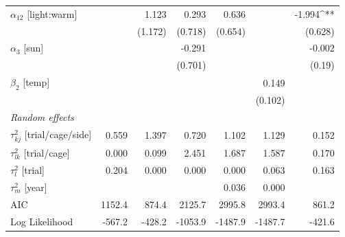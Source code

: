 \documentclass[11pt, oneside]{amsart}
\begin{document}
\begin{table}[!htp]
\begin{center}
\begin{small}
\begin{tabular}{l@{} D{.}{.}{4.6}@{} D{.}{.}{4.5}@{} D{.}{.}{5.6}@{} D{.}{.}{5.6}@{} D{.}{.}{5.4}@{} D{.}{.}{4.6}@{} }
$\alpha_{12}$ [light:warm]                     &              & 1.123       & 0.293       & 0.636       &           & -1.994^{**}  \\
                                               &              & (1.172)     & (0.718)     & (0.654)     &           & (0.628)      \\
$\alpha_{3}$ [sun]                             &              &             & -0.291      &             &           & -0.002       \\
                                               &              &             & (0.701)     &             &           & (0.19)       \\
$\beta_2$ [temp]                               &              &             &             &             & 0.149     &              \\
                                               &              &             &             &             & (0.102)  &              \\
\textit{Random effects} & & & & & & \\
$\tau^2_{kj}$ [trial/cage/side]              & 0.559        & 1.397       & 0.720       & 1.102       & 1.129     & 0.152        \\
$\tau^2_{lk}$ [trial/cage]                   & 0.000        & 0.099       & 2.451       & 1.687       & 1.587     & 0.170        \\
$\tau^2_{l}$ [trial]                         & 0.204        & 0.000       & 0.000       & 0.000       & 0.063     & 0.163        \\
$\tau^2_{m}$ [year]                          &              &             &             & 0.036       & 0.000     &              \\
\midrule
AIC                                            & 1152.4     & 874.4     & 2125.7    & 2995.8    & 2993.4  & 861.2      \\
Log Likelihood                                 & -567.2     & -428.2    & -1053.9   & -1487.9   & -1487.7 & -421.6     \\

\end{tabular}
\end{small}
\end{center}
\end{table}
\end{document}
